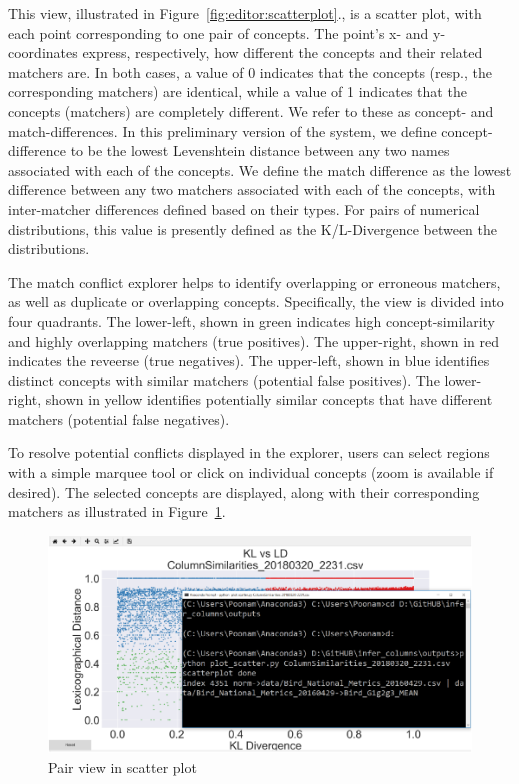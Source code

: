 This view, illustrated in Figure~\ref{fig:editor:scatterplot}., is a scatter plot, with each point corresponding to one pair of concepts.
The point's x- and y-coordinates express, respectively, how different the concepts and their related matchers are.
In both cases, a value of 0 indicates that the concepts (resp., the corresponding matchers) are identical, while a value of 1 indicates that the concepts (matchers) are completely different.
We refer to these as concept- and match-differences.
In this preliminary version of the system, we define concept-difference to be the lowest Levenshtein distance between any two names associated with each of the concepts.
We define the match difference as the lowest difference between any two matchers associated with each of the concepts, with inter-matcher differences defined based on their types.
For pairs of numerical distributions, this value is presently defined as the K/L-Divergence between the distributions.

The match conflict explorer helps to identify overlapping or erroneous matchers, as well as duplicate or overlapping concepts.
Specifically, the view is divided into four quadrants.  The lower-left, shown in green indicates high concept-similarity and highly overlapping matchers (true positives).  
The upper-right, shown in red indicates the reveerse (true negatives).
The upper-left, shown in blue identifies distinct concepts with similar matchers (potential false positives).  
The lower-right, shown in yellow identifies potentially similar concepts that have different matchers (potential false negatives).

To resolve potential conflicts displayed in the explorer, users can select regions with a simple marquee tool or click on individual concepts (zoom is available if desired).
The selected concepts are displayed, along with their corresponding matchers as illustrated in Figure~\ref{fig:pairview}.

\begin{figure}
	\centering
	\includegraphics[trim={0 0 0 15mm},clip,width=\columnwidth]{graphics/Pair_view}
	\caption{Pair view in scatter plot}
	\label{fig:pairview}
	\trimfigurespacing
\end{figure}



